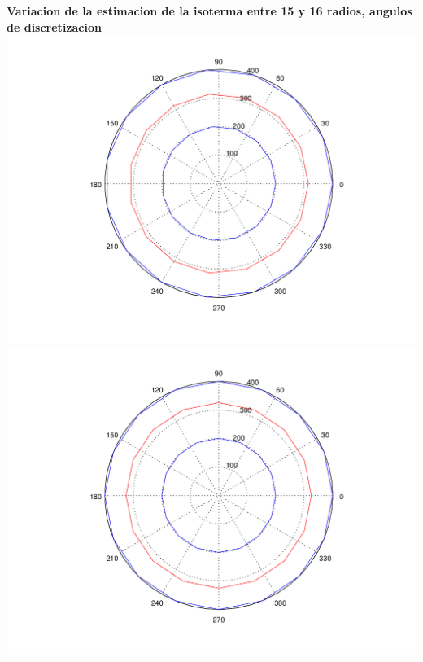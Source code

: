 \begin{enumerate}
	\vspace{0.5cm}
	  	\textbf{Variacion de la estimacion de la isoterma entre 15 y 16 radios, angulos de discretizacion}\\
		\includegraphics[scale=0.35]{experimentos1a_1b/evolucion_posicion_isoterma_temperatura/variacion_radios_angulos_se_reduce_diferencia_radial/test11_testord_001_inst_001_isomap.png}
		\includegraphics[scale=0.35]{experimentos1a_1b/evolucion_posicion_isoterma_temperatura/variacion_radios_angulos_se_reduce_diferencia_radial/test11_testord_002_inst_001_isomap.png}


\end{enumerate}
